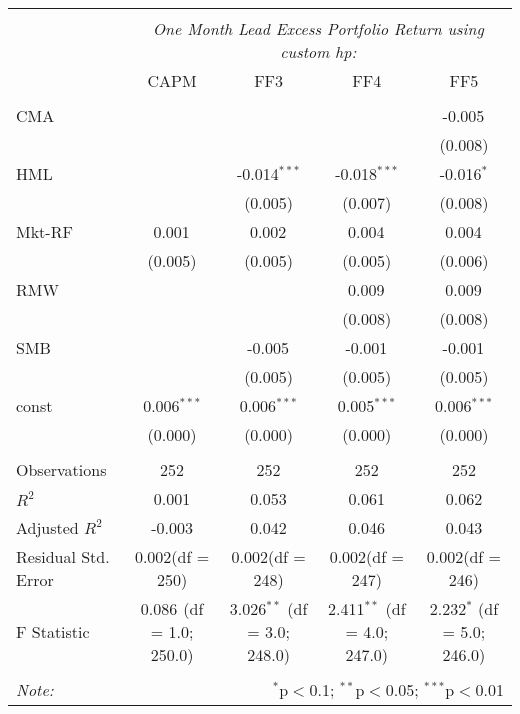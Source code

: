 \begin{table}[!htbp] \centering
\begin{tabular}{@{\extracolsep{5pt}}lcccc}
\\[-1.8ex]\hline
\hline \\[-1.8ex]
& \multicolumn{4}{c}{\textit{One Month Lead Excess Portfolio Return using custom hp:}} \
\cr \cline{4-5}
\\[-1.8ex] & CAPM & FF3 & FF4 & FF5 \\
\hline \\[-1.8ex]
 CMA & & & & -0.005$^{}$ \\
  & & & & (0.008) \\
 HML & & -0.014$^{***}$ & -0.018$^{***}$ & -0.016$^{*}$ \\
  & & (0.005) & (0.007) & (0.008) \\
 Mkt-RF & 0.001$^{}$ & 0.002$^{}$ & 0.004$^{}$ & 0.004$^{}$ \\
  & (0.005) & (0.005) & (0.005) & (0.006) \\
 RMW & & & 0.009$^{}$ & 0.009$^{}$ \\
  & & & (0.008) & (0.008) \\
 SMB & & -0.005$^{}$ & -0.001$^{}$ & -0.001$^{}$ \\
  & & (0.005) & (0.005) & (0.005) \\
 const & 0.006$^{***}$ & 0.006$^{***}$ & 0.005$^{***}$ & 0.006$^{***}$ \\
  & (0.000) & (0.000) & (0.000) & (0.000) \\
\hline \\[-1.8ex]
 Observations & 252 & 252 & 252 & 252 \\
 $R^2$ & 0.001 & 0.053 & 0.061 & 0.062 \\
 Adjusted $R^2$ & -0.003 & 0.042 & 0.046 & 0.043 \\
 Residual Std. Error & 0.002(df = 250) & 0.002(df = 248) & 0.002(df = 247) & 0.002(df = 246)  \\
 F Statistic & 0.086$^{}$ (df = 1.0; 250.0) & 3.026$^{**}$ (df = 3.0; 248.0) & 2.411$^{**}$ (df = 4.0; 247.0) & 2.232$^{*}$ (df = 5.0; 246.0) \\
\hline
\hline \\[-1.8ex]
\textit{Note:} & \multicolumn{4}{r}{$^{*}$p$<$0.1; $^{**}$p$<$0.05; $^{***}$p$<$0.01} \\
\end{tabular}
\end{table}
